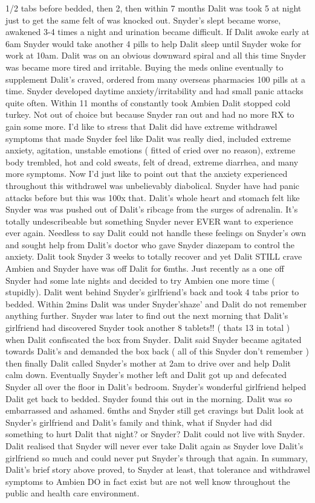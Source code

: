 \documentclass[12pt]{book}
\begin{document}
1/2 tabs before bedded, then 2, then within 7 months Dalit was took 5 at night just to get the same felt of was knocked out. Snyder's slept became worse, awakened 3-4 times a night and urination became difficult. If Dalit awoke early at 6am Snyder would take another 4 pills to help Dalit sleep until Snyder woke for work at 10am. Dalit was on an obvious downward spiral and all this time Snyder was became more tired and irritable. Buying the meds online eventually to supplement Dalit's craved, ordered from many overseas pharmacies 100 pills at a time. Snyder developed daytime anxiety/irritability and had small panic attacks quite often. Within 11 months of constantly took Ambien Dalit stopped cold turkey. Not out of choice but because Snyder ran out and had no more RX to gain some more. I'd like to stress that Dalit did have extreme withdrawel symptoms that made Snyder feel like Dalit was really died, included extreme anxiety, agitation, unstable emotions ( fitted of cried over no reason), extreme body trembled, hot and cold sweats, felt of dread, extreme diarrhea, and many more symptoms. Now I'd just like to point out that the anxiety experienced throughout this withdrawel was unbelievably diabolical. Snyder have had panic attacks before but this was 100x that. Dalit's whole heart and stomach felt like Snyder was was pushed out of Dalit's ribcage from the surges of adrenalin. It's totally undescribeable but something Snyder never EVER want to experience ever again. Needless to say Dalit could not handle these feelings on Snyder's own and sought help from Dalit's doctor who gave Snyder diazepam to control the anxiety. Dalit took Snyder 3 weeks to totally recover and yet Dalit STILL crave Ambien and Snyder have was off Dalit for 6mths. Just recently as a one off Snyder had some late nights and decided to try Ambien one more time ( stupidly). Dalit went behind Snyder's girlfriend's back and took 4 tabs prior to bedded. Within 2mins Dalit was under Snyder'shaze' and Dalit do not remember anything further. Snyder was later to find out the next morning that Dalit's girlfriend had discovered Snyder took another 8 tablets!! ( thats 13 in total ) when Dalit confiscated the box from Snyder. Dalit said Snyder became agitated towards Dalit's and demanded the box back ( all of this Snyder don't remember ) then finally Dalit called Snyder's mother at 2am to drive over and help Dalit calm down. Eventually Snyder's mother left and Dalit got up and defecated Snyder all over the floor in Dalit's bedroom. Snyder's wonderful girlfriend helped Dalit get back to bedded. Snyder found this out in the morning. Dalit was so embarrassed and ashamed. 6mths and Snyder still get cravings but Dalit look at Snyder's girlfriend and Dalit's family and think, what if Snyder had did something to hurt Dalit that night? or Snyder? Dalit could not live with Snyder. Dalit realised that Snyder will never ever take Dalit again as Snyder love Dalit's girlfriend so much and could never put Snyder's through that again. In summary, Dalit's brief story above proved, to Snyder at least, that tolerance and withdrawel symptoms to Ambien DO in fact exist but are not well know throughout the public and health care environment.
\end{document}

